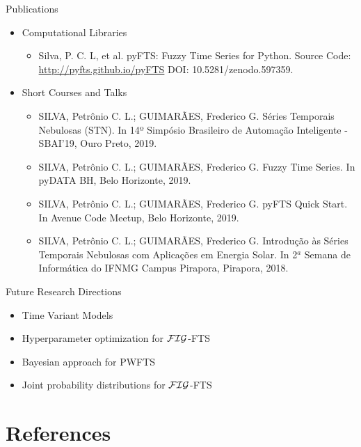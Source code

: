\documentclass{beamer}
\begin{document}
\begin{frame}{Publications}
\begin{itemize}
    \item Computational Libraries
    \begin{itemize}
    \item Silva, P. C. L, et al. pyFTS: Fuzzy Time Series for Python. Source Code: \url{http://pyfts.github.io/pyFTS} DOI: 10.5281/zenodo.597359.
    \end{itemize}
    
    \item Short Courses and Talks
    \begin{itemize}
    \item SILVA, Petrônio C. L.; GUIMARÃES, Frederico G. Séries Temporais Nebulosas (STN). In 14º Simpósio Brasileiro de Automação Inteligente - SBAI'19, Ouro Preto, 2019.
    \item SILVA, Petrônio C. L.; GUIMARÃES, Frederico G. Fuzzy Time Series. In pyDATA BH, Belo Horizonte, 2019.
    \item SILVA, Petrônio C. L.; GUIMARÃES, Frederico G. pyFTS Quick Start. In Avenue Code Meetup, Belo Horizonte, 2019.
    \item SILVA, Petrônio C. L.; GUIMARÃES, Frederico G. Introdução às Séries Temporais Nebulosas com Aplicações em Energia Solar. In 2$^a$ Semana de Informática do IFNMG Campus Pirapora, Pirapora, 2018.
\end{itemize}
\end{itemize}
\end{frame}

\begin{frame}{Future Research Directions}
\begin{itemize}
    \item Time Variant Models
    \item Hyperparameter optimization for $\mathcal{FIG}$-FTS
    \item Bayesian approach for PWFTS
    \item Joint probability distributions for  $\mathcal{FIG}$-FTS
\end{itemize}
\end{frame}



\section{References}



\end{document}

